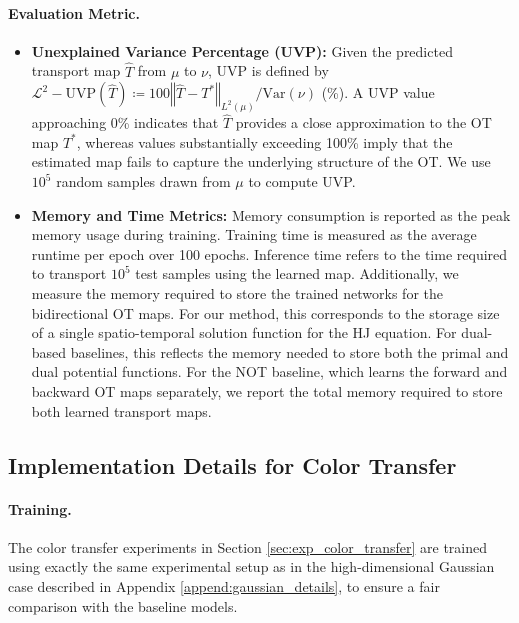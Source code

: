 \documentclass{article} %
\theoremstyle{plain}
\theoremstyle{definition}
\theoremstyle{remark}
\begin{document}
\paragraph{Evaluation Metric.}
\begin{itemize}
\item \textbf{Unexplained Variance Percentage (UVP):} 
Given the predicted transport map $\hat{T}$ from $\mu$ to $\nu$, UVP is defined by
$\mathcal{L}^2-\text{UVP}\left(\hat{T}\right)\coloneqq 100\left\Vert \hat{T}-T^*\right\Vert_{L^2\left(\mu\right)}/\text{Var}\left(\nu\right)$ (\%). 
A UVP value approaching 0\% indicates that $\hat{T}$ provides a close approximation to the OT map $T^*$, whereas values substantially exceeding 100\% imply that the estimated map fails to capture the underlying structure of the OT.
We use $10^5$ random samples drawn from $\mu$ to compute UVP.

\item \textbf{Memory and Time Metrics:}  
Memory consumption is reported as the peak memory usage during training.  
    Training time is measured as the average runtime per epoch over 100 epochs.  
    Inference time refers to the time required to transport $10^5$ test samples using the learned map.  
    Additionally, we measure the memory required to store the trained networks for the bidirectional OT maps.  
    For our method, this corresponds to the storage size of a single spatio-temporal solution function for the HJ equation.  
For dual-based baselines, this reflects the memory needed to store both the primal and dual potential functions.  
For the NOT baseline, which learns the forward and backward OT maps separately, we report the total memory required to store both learned transport maps.
\end{itemize}

\subsection{Implementation Details for Color Transfer}\label{append:color_transfer_details}
\paragraph{Training.} The color transfer experiments in Section \ref{sec:exp_color_transfer} are trained using exactly the same experimental setup as in the high-dimensional Gaussian case described in Appendix \ref{append:gaussian_details}, to ensure a fair comparison with the baseline models.
\end{document}
